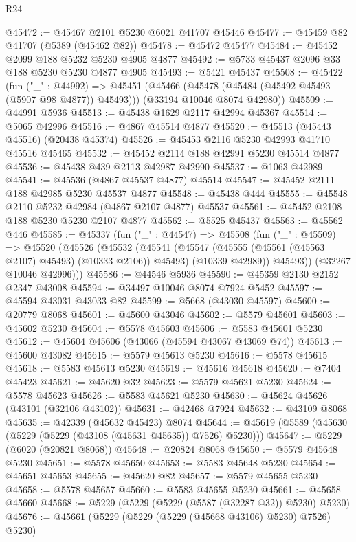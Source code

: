 \begin{lexlean}{R24}
\begin{coremodule}
@45472 := @45467 @2101 @5230 @6021 @41707 @45446
@45477 := @45459 @82 @41707 (@5389 (@45462 @82))
@45478 := @45472 @45477
@45484 := @45452 @2099 @188 @5232 @5230 @4905 @4877
@45492 := @5733 @45437 @2096 @33 @188 @5230 @5230 @4877 @4905
@45493 := @5421 @45437
@45508 := @45422
    (fun ("_" : @44992) =>
    @45451
      (@45466 (@45478 (@45484 (@45492 @45493 (@5907 @98 @4877)) @45493)))
      (@33194 @10046 @8074 @42980))
@45509 := @44991 @5936
@45513 := @45438 @1629 @2117 @42994 @45367
@45514 := @5065 @42996
@45516 := @4867 @45514 @4877
@45520 := @45513 (@45443 @45516) (@20438 @45374)
@45526 := @45453 @2116 @5230 @42993 @41710 @45516 @45465
@45532 := @45452 @2114 @188 @42991 @5230 @45514 @4877
@45536 := @45438 @439 @2113 @42987 @42990
@45537 := @1063 @42989
@45541 := @45536 (@4867 @45537 @4877) @45514
@45547 := @45452 @2111 @188 @42985 @5230 @45537 @4877
@45548 := @45438 @444
@45555 := @45548 @2110 @5232 @42984 (@4867 @2107 @4877) @45537
@45561 := @45452 @2108 @188 @5230 @5230 @2107 @4877
@45562 := @5525 @45437
@45563 := @45562 @446
@45585 := @45337
    (fun ("_" : @44547) =>
    @45508
      (fun ("_" : @45509) =>
      @45520
        (@45526
          (@45532
            (@45541
              (@45547 (@45555 (@45561 (@45563 @2107) @45493) (@10333 @2106)) @45493)
              (@10339 @42989))
            @45493))
        (@32267 @10046 @42996)))
@45586 := @44546 @5936
@45590 := @45359 @2130 @2152 @2347 @43008
@45594 := @34497 @10046 @8074 @7924 @5452
@45597 := @45594 @43031 @43033 @82
@45599 := @5668 (@43030 @45597)
@45600 := @20779 @8068
@45601 := @45600 @43046
@45602 := @5579 @45601
@45603 := @45602 @5230
@45604 := @5578 @45603
@45606 := @5583 @45601 @5230
@45612 := @45604 @45606 (@43066 (@45594 @43067 @43069 @74))
@45613 := @45600 @43082
@45615 := @5579 @45613 @5230
@45616 := @5578 @45615
@45618 := @5583 @45613 @5230
@45619 := @45616 @45618
@45620 := @7404 @45423
@45621 := @45620 @32
@45623 := @5579 @45621 @5230
@45624 := @5578 @45623
@45626 := @5583 @45621 @5230
@45630 := @45624 @45626 (@43101 (@32106 @43102))
@45631 := @42468 @7924
@45632 := @43109 @8068
@45635 := @42339 (@45632 @45423) @8074
@45644 := @45619 (@5589 (@45630 (@5229 (@5229 (@43108 (@45631 @45635)) @7526) @5230)))
@45647 := @5229 (@6020 (@20821 @8068))
@45648 := @20824 @8068
@45650 := @5579 @45648 @5230
@45651 := @5578 @45650
@45653 := @5583 @45648 @5230
@45654 := @45651 @45653
@45655 := @45620 @82
@45657 := @5579 @45655 @5230
@45658 := @5578 @45657
@45660 := @5583 @45655 @5230
@45661 := @45658 @45660
@45668 := @5229 (@5229 (@5229 (@5587 (@32287 @32)) @5230) @5230)
@45676 := @45661 (@5229 (@5229 (@5229 (@45668 @43106) @5230) @7526) @5230)

\end{coremodule}
\end{lexlean}
